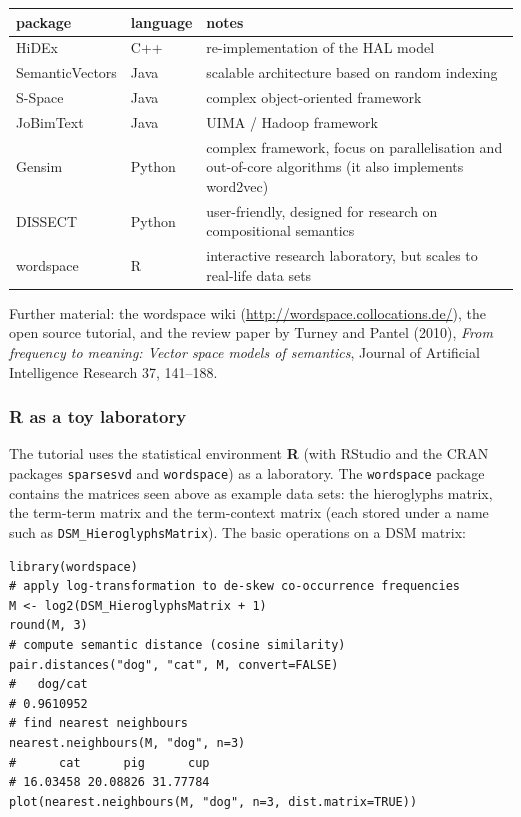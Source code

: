 \begin{center}
\small
\begin{tabularx}{\linewidth}{@{}l l X@{}}
\toprule
\textbf{package} & \textbf{language} & \textbf{notes} \\
\midrule
HiDEx & C++ & re-implementation of the HAL model \\
SemanticVectors & Java & scalable architecture based on random indexing \\
S-Space & Java & complex object-oriented framework \\
JoBimText & Java & UIMA / Hadoop framework \\
Gensim & Python & complex framework, focus on parallelisation and out-of-core algorithms
  (it also implements word2vec) \\
DISSECT & Python & user-friendly, designed for research on compositional semantics \\
wordspace & R & interactive research laboratory, but scales to real-life data sets \\
\bottomrule
\end{tabularx}
\end{center}

Further material: the wordspace wiki (\url{http://wordspace.collocations.de/}), the open
source tutorial, and the review paper by Turney and Pantel (2010), \emph{From frequency
to meaning: Vector space models of semantics}, Journal of Artificial Intelligence
Research 37, 141--188.

\subsubsection{R as a toy laboratory}

The tutorial uses the statistical environment \textbf{R} (with RStudio and the CRAN
packages \texttt{sparsesvd} and \texttt{wordspace}) as a laboratory. The
\texttt{wordspace} package contains the matrices seen above as example data sets: the
hieroglyphs matrix, the term-term matrix and the term-context matrix (each stored under a
name such as \texttt{DSM\_HieroglyphsMatrix}). The basic operations on a DSM matrix:

\begin{verbatim}
library(wordspace)
# apply log-transformation to de-skew co-occurrence frequencies
M <- log2(DSM_HieroglyphsMatrix + 1)
round(M, 3)
# compute semantic distance (cosine similarity)
pair.distances("dog", "cat", M, convert=FALSE)
#   dog/cat
# 0.9610952
# find nearest neighbours
nearest.neighbours(M, "dog", n=3)
#      cat      pig      cup
# 16.03458 20.08826 31.77784
plot(nearest.neighbours(M, "dog", n=3, dist.matrix=TRUE))
\end{verbatim}

